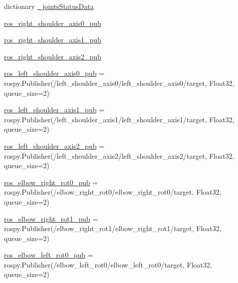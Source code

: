 \begin{DoxyCompactItemize}
\item 
dictionary \mbox{\hyperlink{namespacesteering__simulation_a151daa71bd805d2dd04fe522c1ddac4f}{\+\_\+joints\+Status\+Data}}
\item 
\mbox{\hyperlink{namespacesteering__simulation_a7824803c03df4637e22449c926522d6d}{ros\+\_\+right\+\_\+shoulder\+\_\+axis0\+\_\+pub}}
\item 
\mbox{\hyperlink{namespacesteering__simulation_a5da8818119a4289e3ed21573706ee4ad}{ros\+\_\+right\+\_\+shoulder\+\_\+axis1\+\_\+pub}}
\item 
\mbox{\hyperlink{namespacesteering__simulation_a70a5d7e7cbdd1a4af5ac27b114633b9d}{ros\+\_\+right\+\_\+shoulder\+\_\+axis2\+\_\+pub}}
\item 
\mbox{\hyperlink{namespacesteering__simulation_a0f7519e7fbc7a8cabdcdde1482ccacde}{ros\+\_\+left\+\_\+shoulder\+\_\+axis0\+\_\+pub}} = rospy.\+Publisher(\textquotesingle{}/left\+\_\+shoulder\+\_\+axis0/left\+\_\+shoulder\+\_\+axis0/target\textquotesingle{}, Float32, queue\+\_\+size=2)
\item 
\mbox{\hyperlink{namespacesteering__simulation_a75aaf98b6863a0aee4b61ee17b0133ba}{ros\+\_\+left\+\_\+shoulder\+\_\+axis1\+\_\+pub}} = rospy.\+Publisher(\textquotesingle{}/left\+\_\+shoulder\+\_\+axis1/left\+\_\+shoulder\+\_\+axis1/target\textquotesingle{}, Float32, queue\+\_\+size=2)
\item 
\mbox{\hyperlink{namespacesteering__simulation_af594d9d0bfdf575e6e26e0b6a3a53c8b}{ros\+\_\+left\+\_\+shoulder\+\_\+axis2\+\_\+pub}} = rospy.\+Publisher(\textquotesingle{}/left\+\_\+shoulder\+\_\+axis2/left\+\_\+shoulder\+\_\+axis2/target\textquotesingle{}, Float32, queue\+\_\+size=2)
\item 
\mbox{\hyperlink{namespacesteering__simulation_a3d22b5897eee35c841b1df82b5d02111}{ros\+\_\+elbow\+\_\+right\+\_\+rot0\+\_\+pub}} = rospy.\+Publisher(\textquotesingle{}/elbow\+\_\+right\+\_\+rot0/elbow\+\_\+right\+\_\+rot0/target\textquotesingle{}, Float32, queue\+\_\+size=2)
\item 
\mbox{\hyperlink{namespacesteering__simulation_a1280b460562790964403c7752bbc056d}{ros\+\_\+elbow\+\_\+right\+\_\+rot1\+\_\+pub}} = rospy.\+Publisher(\textquotesingle{}/elbow\+\_\+right\+\_\+rot1/elbow\+\_\+right\+\_\+rot1/target\textquotesingle{}, Float32, queue\+\_\+size=2)
\item 
\mbox{\hyperlink{namespacesteering__simulation_a3e18ade3c9e741db3cd48035d7d11b43}{ros\+\_\+elbow\+\_\+left\+\_\+rot0\+\_\+pub}} = rospy.\+Publisher(\textquotesingle{}/elbow\+\_\+left\+\_\+rot0/elbow\+\_\+left\+\_\+rot0/target\textquotesingle{}, Float32, queue\+\_\+size=2)

\end{DoxyCompactItemize}
